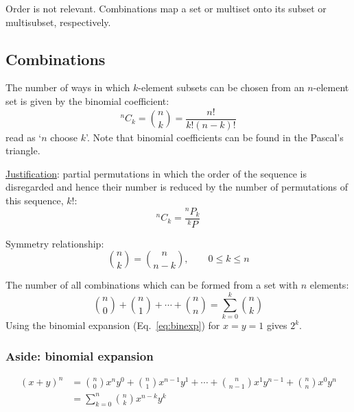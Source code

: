 \documentclass{article}
\begin{document}
Order is not relevant. Combinations map a set or multiset onto its subset or multisubset, respectively.

\subsection{Combinations}
\label{combinations}

The number of ways in which $k$\nobreakdash-\hspace{0pt}element subsets can be chosen from an $n$\nobreakdash-\hspace{0pt}element set is given by the binomial coefficient:
\begin{equation}
    ^nC_k = \binom{n}{k} = \frac{n!}{k!(n-k)!}
\end{equation}
read as `$n$ choose $k$'. Note that binomial coefficients can be found in the Pascal's triangle.

\underline{Justification}: partial permutations in which the order of the sequence is disregarded and hence their number is reduced by the number of permutations of this sequence, $k!$:
\begin{equation}
        ^nC_k = \frac{^nP_k}{^kP}
\end{equation}

Symmetry relationship:
\begin{equation}
    \label{eq:symrel}
    \binom{n}{k} = \binom{n}{n-k}, \qquad 0 \le k \le n
\end{equation}

The number of all combinations which can be formed from a set with $n$ elements:
\begin{equation}
    \binom{n}{0} + \binom{n}{1} + \dotsb + \binom{n}{n}= \sum_{k=0}^{k} \binom{n}{k}
\end{equation}
Using the binomial expansion (Eq.~\ref{eq:binexp}) for $x=y=1$ gives $2^k$.

\subsubsection{Aside: binomial expansion}

\begin{equation}
    \label{eq:binexp}
    \begin{split}
        (x+y)^n & = \binom{n}{0} x^n y^0 + \binom{n}{1} x^{n-1} y^1 + \dotsb + \binom{n}{n-1} x^1 y^{n-1} + \binom{n}{n} x^0 y^n \\
                & = \sum_{k=0}^{n} \binom{n}{k} x^{n-k} y^k
    \end{split}
\end{equation}
\end{document}
